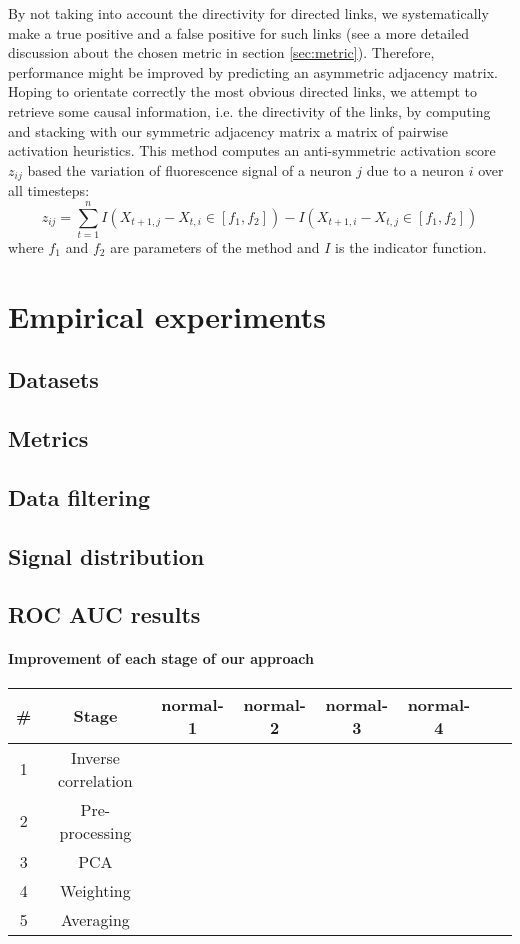 \documentclass[wcp]{jmlr}
\begin{document}
By not taking into account the directivity for directed links, we systematically
make a true positive and a false positive for such links (see a more detailed
discussion about the chosen metric in section \ref{sec:metric}). Therefore,
performance might be improved by predicting an asymmetric adjacency matrix.
Hoping to orientate correctly the most obvious directed links, we attempt to
retrieve some causal information, i.e. the directivity of the links, by computing
and stacking with our symmetric adjacency matrix a matrix of pairwise activation
heuristics. This method computes an anti-symmetric activation score $z_{ij}$
based the variation of fluorescence signal of a neuron $j$ due to a neuron $i$
over all timesteps:
\[
z_{ij} = \sum_{t=1}^n I(X_{t+1,j} - X_{t, i} \in [f_1, f_2]) -  I(X_{t+1,i} - X_{t, j} \in [f_1, f_2])
\]
where $f_1$ and $f_2$ are parameters of the method and $I$ is the
indicator function. %


\section{Empirical experiments}
\subsection{Datasets}




\subsection{Metrics}
\subsection{Data filtering}
\subsection{Signal distribution}
\subsection{ROC AUC results}
\paragraph{Improvement of each stage of our approach\\}


\begin{table}[htb]
\centering
\begin{tabular}{|c|c||c|c|c|c|c|c|} \hline
\# & Stage & normal-1 & normal-2 & normal-3 & normal-4 \\ \hline
1 & Inverse correlation & & & & \\ \hline
2 & Pre-processing & & & &\\ \hline
3 & PCA & & & &  \\ \hline
4 & Weighting & & & &  \\ \hline
5 & Averaging & & & &  \\ \hline

\end{tabular}
\end{table}
\end{document}
